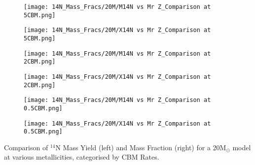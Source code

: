 \begin{minipage}{\textwidth}
	\centering
	\begin{subfigure}{0.49\textwidth}
		\texttt{[image: 14N\_Mass\_Fracs/20M/M14N vs Mr Z\_Comparison at 5CBM.png]}
	\end{subfigure}
        \hfill
	\begin{subfigure}{0.49\textwidth}
		\texttt{[image: 14N\_Mass\_Fracs/20M/X14N vs Mr Z\_Comparison at 5CBM.png]}
	\end{subfigure}
        \label{fig:14N_20M_5CBM}
\end{minipage}
\begin{minipage}{\textwidth}
	\centering
	\begin{subfigure}{0.49\textwidth}
		\texttt{[image: 14N\_Mass\_Fracs/20M/M14N vs Mr Z\_Comparison at 2CBM.png]}
	\end{subfigure}
        \hfill
	\begin{subfigure}{0.49\textwidth}
		\texttt{[image: 14N\_Mass\_Fracs/20M/X14N vs Mr Z\_Comparison at 2CBM.png]}
	\end{subfigure}
        \label{fig:14N_20M_2CBM}
\end{minipage}
\begin{minipage}{\textwidth}
	\centering
	\begin{subfigure}{0.49\textwidth}
		\texttt{[image: 14N\_Mass\_Fracs/20M/M14N vs Mr Z\_Comparison at 0.5CBM.png]}
	\end{subfigure}
        \hfill
	\begin{subfigure}{0.49\textwidth}
		\texttt{[image: 14N\_Mass\_Fracs/20M/X14N vs Mr Z\_Comparison at 0.5CBM.png]}
	\end{subfigure}
	 \caption{Comparison of $^{14}$N Mass Yield (left) and Mass Fraction (right) for a 20M$_\odot$ model at various metallicities, categorised by CBM Rates.}
        \label{fig:14N_20M_0.5CBM}
\end{minipage}

